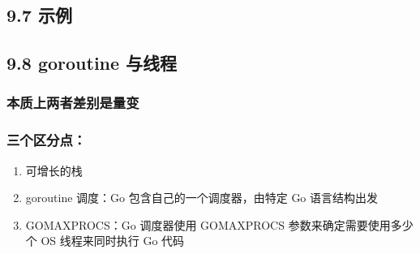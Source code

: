 \hypertarget{ux793aux4f8b}{%
\subsection{9.7 示例}\label{ux793aux4f8b}}

\hypertarget{goroutine-ux4e0eux7ebfux7a0b}{%
\subsection{9.8 goroutine 与线程}\label{goroutine-ux4e0eux7ebfux7a0b}}

\hypertarget{ux672cux8d28ux4e0aux4e24ux8005ux5deeux522bux662fux91cfux53d8}{%
\subsubsection{本质上两者差别是量变}\label{ux672cux8d28ux4e0aux4e24ux8005ux5deeux522bux662fux91cfux53d8}}

\hypertarget{ux4e09ux4e2aux533aux5206ux70b9}{%
\subsubsection{三个区分点：}\label{ux4e09ux4e2aux533aux5206ux70b9}}

\begin{enumerate}
\def\labelenumi{\arabic{enumi}.}
\tightlist
\item
  可增长的栈
\item
  goroutine 调度：Go 包含自己的一个调度器，由特定 Go 语言结构出发
\item
  GOMAXPROCS：Go 调度器使用 GOMAXPROCS 参数来确定需要使用多少个 OS
  线程来同时执行 Go 代码
\end{enumerate}
